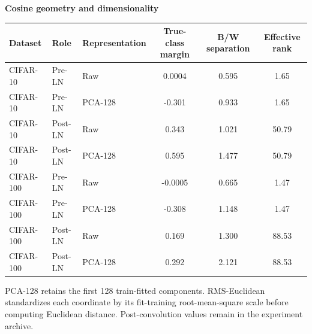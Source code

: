 \begin{table}[!htbp]
\begin{threeparttable}
\vspace{5pt}
\textbf{Cosine geometry and dimensionality}\par\vspace{2pt}
\begin{tabularx}{\linewidth}{@{}l l l c c c@{}}
\toprule
Dataset & Role & Representation & True-class margin & B/W separation & Effective rank\\
\midrule
CIFAR-10 & Pre-LN & Raw & 0.0004 & 0.595 & 1.65\\
\thinrowrule
CIFAR-10 & Pre-LN & PCA-128 & -0.301 & 0.933 & 1.65\\
\thinrowrule
CIFAR-10 & Post-LN & Raw & 0.343 & 1.021 & 50.79\\
\thinrowrule
CIFAR-10 & Post-LN & PCA-128 & 0.595 & 1.477 & 50.79\\
\midrule
CIFAR-100 & Pre-LN & Raw & -0.0005 & 0.665 & 1.47\\
\thinrowrule
CIFAR-100 & Pre-LN & PCA-128 & -0.308 & 1.148 & 1.47\\
\thinrowrule
CIFAR-100 & Post-LN & Raw & 0.169 & 1.300 & 88.53\\
\thinrowrule
CIFAR-100 & Post-LN & PCA-128 & 0.292 & 2.121 & 88.53\\
\bottomrule
\end{tabularx}
\begin{tablenotes}[flushleft]\footnotesize
\item PCA-128 retains the first 128 train-fitted components. RMS-Euclidean standardizes each coordinate by its fit-training root-mean-square scale before computing Euclidean distance. Post-convolution values remain in the experiment archive.
\end{tablenotes}
\end{threeparttable}
\end{table}
